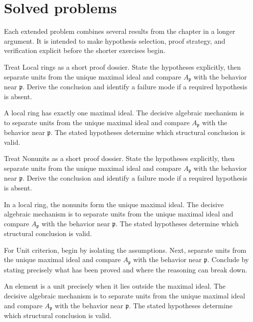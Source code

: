 \section{Solved problems}
Each extended problem combines several results from the chapter in a longer argument. It is intended to make hypothesis selection, proof strategy, and verification explicit before the shorter exercises begin.

\begin{problem}\label{prob:v08-problem-01}
Treat Local rings as a short proof dossier. State the hypotheses explicitly, then separate units from the unique maximal ideal and compare \(A_{\mathfrak p}\) with the behavior near \(\mathfrak p\). Derive the conclusion and identify a failure mode if a required hypothesis is absent.
\end{problem}
\begin{solution}
A local ring has exactly one maximal ideal. The decisive algebraic mechanism is to separate units from the unique maximal ideal and compare \(A_{\mathfrak p}\) with the behavior near \(\mathfrak p\). The stated hypotheses determine which structural conclusion is valid.
\end{solution}

\begin{problem}\label{prob:v08-problem-02}
Treat Nonunits as a short proof dossier. State the hypotheses explicitly, then separate units from the unique maximal ideal and compare \(A_{\mathfrak p}\) with the behavior near \(\mathfrak p\). Derive the conclusion and identify a failure mode if a required hypothesis is absent.
\end{problem}
\begin{solution}
In a local ring, the nonunits form the unique maximal ideal. The decisive algebraic mechanism is to separate units from the unique maximal ideal and compare \(A_{\mathfrak p}\) with the behavior near \(\mathfrak p\). The stated hypotheses determine which structural conclusion is valid.
\end{solution}

\begin{problem}\label{prob:v08-problem-03}
For Unit criterion, begin by isolating the assumptions. Next, separate units from the unique maximal ideal and compare \(A_{\mathfrak p}\) with the behavior near \(\mathfrak p\). Conclude by stating precisely what has been proved and where the reasoning can break down.
\end{problem}
\begin{solution}
An element is a unit precisely when it lies outside the maximal ideal. The decisive algebraic mechanism is to separate units from the unique maximal ideal and compare \(A_{\mathfrak p}\) with the behavior near \(\mathfrak p\). The stated hypotheses determine which structural conclusion is valid.
\end{solution}

